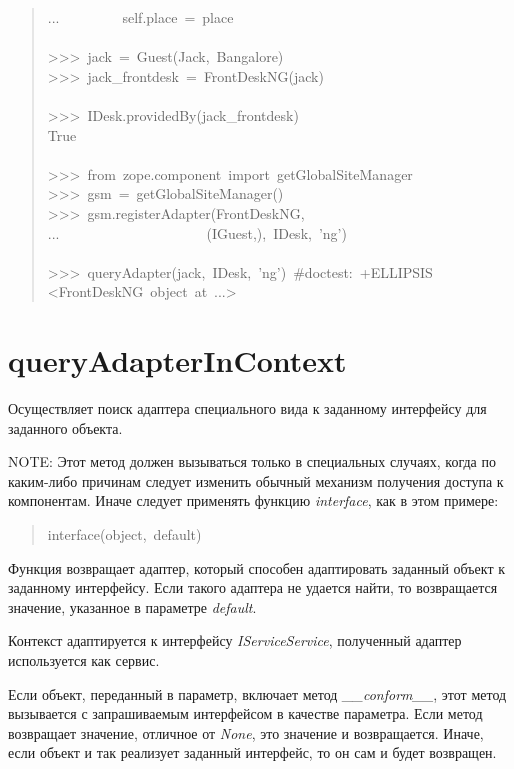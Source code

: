 \documentclass[14pt,a4paper,openany,twoside,final]{extbook}
\providecommand*{\DUroletitlereference}[1]{\textsl{#1}}
\begin{document}
\begin{quote}
{...~~~~~~~~~self.place~=~place\\
~\\
>{}>{}>~jack~=~Guest(\textquotedbl{}Jack\textquotedbl{},~\textquotedbl{}Bangalore\textquotedbl{})\\
>{}>{}>~jack\_frontdesk~=~FrontDeskNG(jack)\\
~\\
>{}>{}>~IDesk.providedBy(jack\_frontdesk)\\
True\\
~\\
>{}>{}>~from~zope.component~import~getGlobalSiteManager\\
>{}>{}>~gsm~=~getGlobalSiteManager()\\
>{}>{}>~gsm.registerAdapter(FrontDeskNG,\\
...~~~~~~~~~~~~~~~~~~~~~(IGuest,),~IDesk,~'ng')\\
~\\
>{}>{}>~queryAdapter(jack,~IDesk,~'ng')~\#doctest:~+ELLIPSIS\\
<FrontDeskNG~object~at~...>
}
\end{quote}


\section*{queryAdapterInContext%
  \label{queryadapterincontext}%
}

Осуществляет поиск адаптера специального вида к заданному интерфейсу
для заданного объекта.

NOTE: Этот метод должен вызываться только в специальных случаях, когда
по каким-либо причинам следует изменить обычный механизм получения
доступа к компонентам.  Иначе следует применять функцию \DUroletitlereference{interface},
как в этом примере:

\begin{quote}{\ttfamily \raggedright \noindent
interface(object,~default)
}
\end{quote}

Функция возвращает адаптер, который способен адаптировать заданный
объект к заданному интерфейсу.  Если такого адаптера не удается найти,
то возвращается значение, указанное в параметре \DUroletitlereference{default}.

Контекст адаптируется к интерфейсу \DUroletitlereference{IServiceService}, полученный адаптер
используется как сервис.

Если объект, переданный в параметр, включает метод \DUroletitlereference{\_\_conform\_\_}, этот
метод вызывается с запрашиваемым интерфейсом в качестве параметра.
Если метод возвращает значение, отличное от \DUroletitlereference{None}, это значение
и возвращается.  Иначе, если объект и так реализует заданный
интерфейс, то он сам и будет возвращен.
\end{document}
